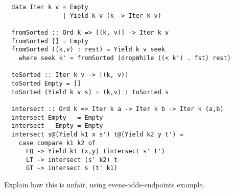 \documentclass[acmsmall,screen,review,anonymous,dvipsnames]{acmart}
\newcommand\todo[1]{{\color{Orange}#1}}
\begin{document}
\begin{verbatim}
  data Iter k v = Empty
                | Yield k v (k -> Iter k v)

  fromSorted :: Ord k => [(k, v)] -> Iter k v
  fromSorted [] = Empty
  fromSorted ((k,v) : rest) = Yield k v seek
    where seek k' = fromSorted (dropWhile ((< k') . fst) rest)

  toSorted :: Iter k v -> [(k, v)]
  toSorted Empty = []
  toSorted (Yield k v s) = (k,v) : toSorted s

  intersect :: Ord k => Iter k a -> Iter k b -> Iter k (a,b)
  intersect Empty _ = Empty
  intersect _ Empty = Empty
  intersect s@(Yield k1 x s') t@(Yield k2 y t') =
    case compare k1 k2 of
      EQ -> Yield k1 (x,y) (intersect s' t')
      LT -> intersect (s' k2) t
      GT -> intersect s (t' k1)
\end{verbatim}

\noindent
\todo{Explain how this is unfair, using evens-odds-endpoints example.}
\end{document}
